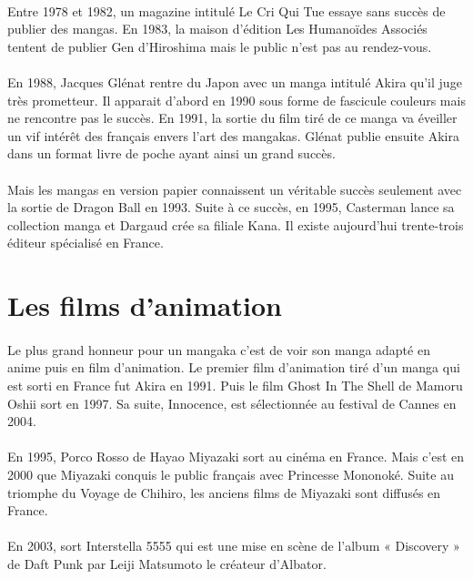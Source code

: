 \paragraph{}
Entre 1978 et 1982, un magazine intitulé Le Cri Qui Tue essaye sans succès de publier des mangas. En 1983, la maison d’édition Les Humanoïdes Associés tentent de publier Gen d’Hiroshima mais le public n’est pas au rendez-vous. 
\paragraph{}
En 1988, Jacques Glénat rentre du Japon avec un manga intitulé Akira qu’il juge très prometteur. Il apparait d’abord en 1990 sous forme de fascicule couleurs mais ne rencontre pas le succès. En 1991, la sortie du film tiré de ce manga va éveiller un vif intérêt des français envers l’art des mangakas. Glénat publie ensuite Akira dans un format livre de poche ayant ainsi un grand succès. 
\paragraph{}
Mais les mangas en version papier connaissent un véritable succès seulement avec la sortie de Dragon Ball en 1993. Suite à ce succès, en 1995, Casterman lance sa collection manga et Dargaud crée sa filiale Kana.  Il existe 	aujourd’hui trente-trois éditeur spécialisé en France.

\section{Les films d'animation}
\paragraph{}
Le plus grand honneur pour un mangaka c’est de voir son manga adapté en anime puis en film d’animation. Le premier film d’animation tiré d’un manga qui est sorti en France fut Akira en 1991. Puis le film Ghost In The Shell de Mamoru Oshii sort en 1997. Sa suite, Innocence, est sélectionnée au festival de Cannes en 2004.
\paragraph{}
En 1995, Porco Rosso de Hayao Miyazaki sort au cinéma en France. Mais c’est en 2000 que Miyazaki conquis le public français avec Princesse Mononoké. Suite au triomphe du Voyage de Chihiro, les anciens films de Miyazaki sont diffusés en France. 
\paragraph{}
En 2003, sort Interstella 5555 qui est une mise en scène de l’album « Discovery » de Daft Punk par Leiji Matsumoto le créateur d’Albator.

